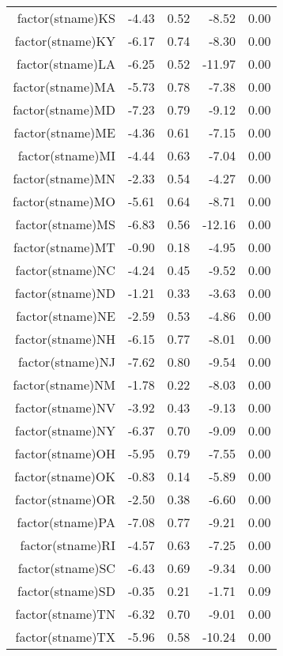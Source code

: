 \begin{table}[ht]
\begin{tabular}{rrrrr}
  factor(stname)KS & -4.43 & 0.52 & -8.52 & 0.00 \\ 
  factor(stname)KY & -6.17 & 0.74 & -8.30 & 0.00 \\ 
  factor(stname)LA & -6.25 & 0.52 & -11.97 & 0.00 \\ 
  factor(stname)MA & -5.73 & 0.78 & -7.38 & 0.00 \\ 
  factor(stname)MD & -7.23 & 0.79 & -9.12 & 0.00 \\ 
  factor(stname)ME & -4.36 & 0.61 & -7.15 & 0.00 \\ 
  factor(stname)MI & -4.44 & 0.63 & -7.04 & 0.00 \\ 
  factor(stname)MN & -2.33 & 0.54 & -4.27 & 0.00 \\ 
  factor(stname)MO & -5.61 & 0.64 & -8.71 & 0.00 \\ 
  factor(stname)MS & -6.83 & 0.56 & -12.16 & 0.00 \\ 
  factor(stname)MT & -0.90 & 0.18 & -4.95 & 0.00 \\ 
  factor(stname)NC & -4.24 & 0.45 & -9.52 & 0.00 \\ 
  factor(stname)ND & -1.21 & 0.33 & -3.63 & 0.00 \\ 
  factor(stname)NE & -2.59 & 0.53 & -4.86 & 0.00 \\ 
  factor(stname)NH & -6.15 & 0.77 & -8.01 & 0.00 \\ 
  factor(stname)NJ & -7.62 & 0.80 & -9.54 & 0.00 \\ 
  factor(stname)NM & -1.78 & 0.22 & -8.03 & 0.00 \\ 
  factor(stname)NV & -3.92 & 0.43 & -9.13 & 0.00 \\ 
  factor(stname)NY & -6.37 & 0.70 & -9.09 & 0.00 \\ 
  factor(stname)OH & -5.95 & 0.79 & -7.55 & 0.00 \\ 
  factor(stname)OK & -0.83 & 0.14 & -5.89 & 0.00 \\ 
  factor(stname)OR & -2.50 & 0.38 & -6.60 & 0.00 \\ 
  factor(stname)PA & -7.08 & 0.77 & -9.21 & 0.00 \\ 
  factor(stname)RI & -4.57 & 0.63 & -7.25 & 0.00 \\ 
  factor(stname)SC & -6.43 & 0.69 & -9.34 & 0.00 \\ 
  factor(stname)SD & -0.35 & 0.21 & -1.71 & 0.09 \\ 
  factor(stname)TN & -6.32 & 0.70 & -9.01 & 0.00 \\ 
  factor(stname)TX & -5.96 & 0.58 & -10.24 & 0.00 \\ 

\end{tabular}
\end{table}
